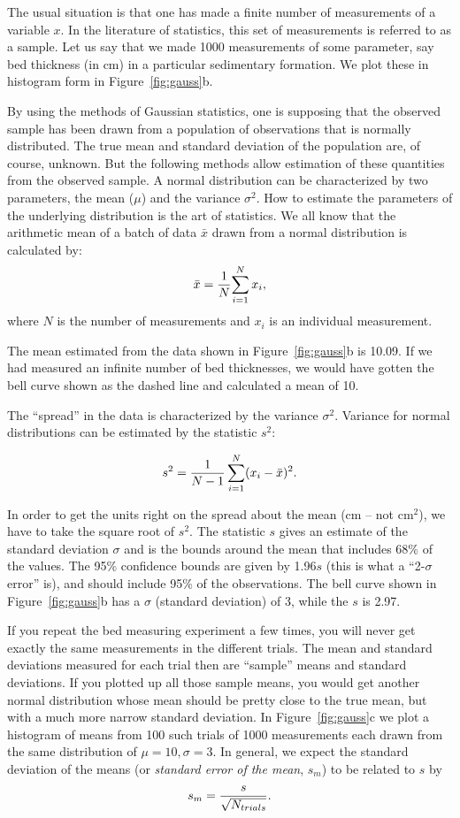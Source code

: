 The usual situation is that one has made a finite number of measurements of a variable $x$. In the
literature of statistics, this set of measurements is referred to as a sample. Let us say that we made 1000 measurements of some parameter, say bed thickness (in cm)
in a particular sedimentary formation.  We plot these
in histogram form in Figure~\ref{fig:gauss}b. 

By using the methods of Gaussian
statistics, one is supposing that the observed sample has been drawn from a population of observations that
is normally distributed. The true mean and standard deviation of the population are, of course, unknown.
But the following methods allow estimation of these quantities from the observed sample.
A normal distribution can be characterized by two parameters, the mean
($\mu$) and  the variance $\sigma^2$.   How to estimate the parameters
of the underlying distribution is the art of statistics.  We all
know that the arithmetic mean of a batch of data $\bar x$ drawn from a normal distribution
is calculated by:
$$
{\bar x }= {1\over N} {\sum_{i=1}^N x_i},
$$
\noindent where $N$ is the number of measurements and $x_i$ is an individual measurement. 

The mean estimated from the data shown in Figure~\ref{fig:gauss}b is
10.09.  If we had measured an infinite number of bed thicknesses, we would have
gotten the bell curve shown  as  the dashed line  and calculated a mean of
10.  

The ``spread'' in the data is characterized by the
 variance $\sigma^2$.
Variance for normal distributions can be estimated by the statistic
 $s^2$:

\begin{equation}
s^2 = {1\over {N-1}} \sum_{i=1}^N (x_i-\bar x)^2.
\label{eq:sigma}
\end{equation}


In order to get the units right on the spread about the mean (cm -- not cm$^2$), we have to take the 
square root of $s^2$.  The statistic $s$ gives an estimate of the 
standard deviation $\sigma$ and is the bounds around the mean that includes 
68\% of the values.  The 95\% confidence bounds are given by
1.96$s$ (this is what a ``2-$\sigma$ error'' is), and should include
95\% of the observations.
The bell curve shown in Figure~\ref{fig:gauss}b  has a $\sigma$ (standard deviation)
of 3, while the $s$ is  2.97.


If you repeat the bed measuring experiment
 a few times, you will never get exactly the same measurements in the different trials.  The mean and standard deviations measured
for each trial then are ``sample'' means and standard deviations.
If you plotted up all those sample means, you would get another
normal distribution whose mean should be pretty close to the 
true mean, but with a much more narrow standard deviation.  In Figure~\ref{fig:gauss}c we plot a histogram of  means from 100 such trials of 1000 measurements  each drawn from the same distribution of $\mu = 10, \sigma = 3$.  In general,
we expect the standard deviation of the means (or  
{\it standard error of the mean},  $s_m$)  to be related to $s$ by 
$$
s_m = {s\over {\sqrt{N_{trials}}}}.
$$


